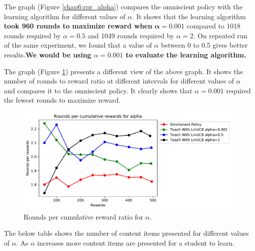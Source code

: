 The graph (Figure \ref{chap6:rpr_alpha}) compares the omniscient policy with the learning algorithm for different values of $\alpha$. It shows that the learning algorithm \textbf{took 960 rounds to maximize reward when} $\mathbf{\alpha = 0.001}$ compared to 1018 rounds required by $\alpha = 0.5$ and 1049 rounds required by $\alpha = 2$. On repeated run of the same experiment, we found that a value of $\alpha$ between 0 to 0.5 gives better results.\textbf{We would be using $\alpha = 0.001$ to evaluate the learning algorithm.} \par

The graph (Figure \ref{chap6:rprr_alpha}) presents a different view of the above graph. It shows the number of rounds to reward ratio at different intervals for different values of $\alpha$ and compares it to the omniscient policy. It clearly shows that $\alpha = 0.001$ required the fewest rounds to maximize reward. 

\begin{figure}[H]
	\centering
    \includegraphics[scale=0.85]{Figures/rounds_per_reward_ratio_for_alpha.pdf}
    \caption{Rounds per cumulative reward ratio for $\alpha$.}
    \label{chap6:rprr_alpha}
\end{figure}



The below table shows the number of content items presented for different values of $\alpha$. As $\alpha$ increases more content items are presented for a student to learn.

